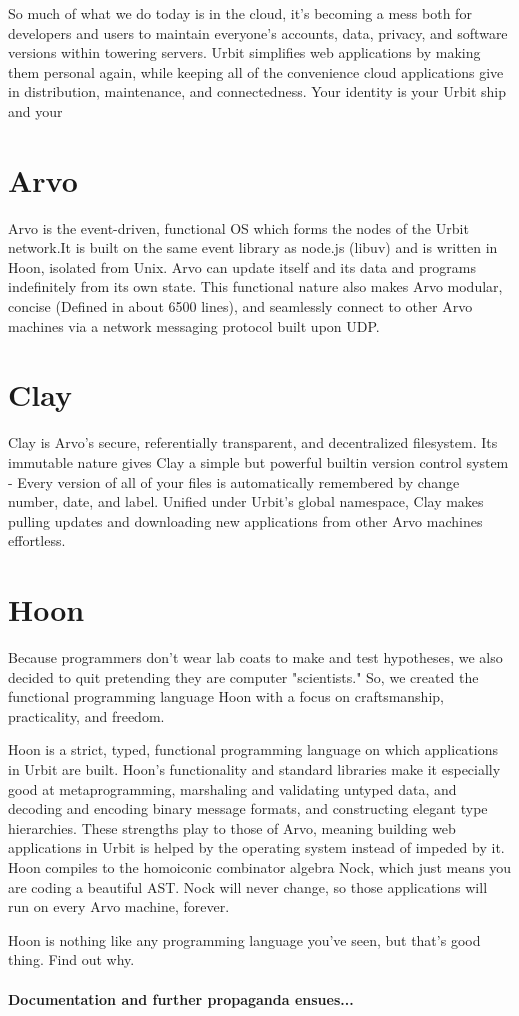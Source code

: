\documentclass[12]{article}
\begin{document}
So much of what we do today is in the cloud, it's becoming a mess both for developers and users to 
maintain everyone's accounts, data, privacy, and software versions within towering servers.  Urbit simplifies 
web applications by making them personal again, while keeping all of the convenience cloud applications 
give in distribution, maintenance, and connectedness.  Your identity is your Urbit ship and your 

\section*{Arvo}

Arvo is the event-driven, functional OS which forms the nodes of the Urbit network.It is built on the same event library as node.js (libuv)
and is written in Hoon, isolated from Unix.  Arvo can update itself and its data and programs indefinitely from its own state.
This functional nature also makes Arvo modular, concise (Defined in about 6500 lines), and seamlessly connect to other Arvo machines via a
network messaging protocol built upon UDP.

\section*{Clay}

Clay is Arvo's secure, referentially transparent, and decentralized filesystem.  Its immutable nature gives Clay a simple but powerful
builtin version control system - Every version of all of your files is automatically remembered by change number, date, and label.
Unified under Urbit's global namespace, Clay makes pulling updates and downloading new applications from other Arvo machines effortless.

\section*{Hoon}

Because programmers don't wear lab coats to make and test hypotheses, we also decided to quit pretending they are computer "scientists."
So, we created the functional programming language Hoon with a focus on craftsmanship, practicality, and freedom.

Hoon is a strict, typed, functional programming language on which applications in Urbit are built.
Hoon's functionality and standard libraries make it especially good at metaprogramming, marshaling and validating untyped data, and decoding and encoding binary message formats,
and constructing elegant type hierarchies.  These strengths play to those of Arvo, meaning building web applications in Urbit is helped by the operating system instead of impeded by it.
Hoon compiles to the homoiconic combinator algebra Nock, which just means you are coding a beautiful AST.  Nock will never change, so those applications will run on every Arvo machine, forever.

Hoon is nothing like any programming language you've seen, but that's good thing.  Find out why. \\ \\
\textbf{Documentation and further propaganda ensues...}
\end{document}
